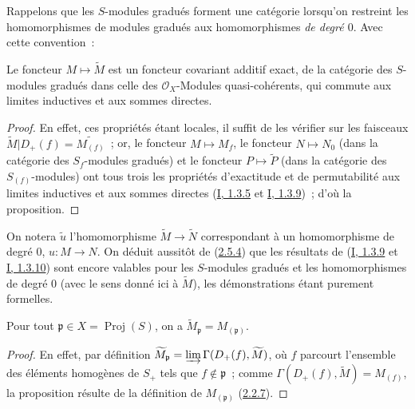 Rappelons que les $S$-modules gradués forment une catégorie lorsqu'on
restreint les homomorphismes de modules gradués aux homomorphismes
\emph{de degré $0$}. Avec cette convention~:

\begin{proposition}[2.5.4]
\label{II.2.5.4-fr}
Le foncteur $M\mapsto\widetilde{M}$ est un foncteur covariant additif exact,
de la catégorie des $S$-modules gradués dans celle des
$\mathcal{O}_X$-Modules quasi-cohérents, qui commute aux limites
inductives et aux sommes directes.
\end{proposition}

\begin{proof}
En effet, ces propriétés étant locales, il suffit de les vérifier sur les
faisceaux
$\widetilde{M}|D_+(f)=\widetilde{M_{(f)}}$~; or, le foncteur
$M\mapsto M_f$, le foncteur $N\mapsto N_0$ (dans la catégorie des
$S_f$-modules gradués) et le foncteur $P\mapsto\widetilde{P}$ (dans la
catégorie des $S_{(f)}$-modules) ont tous trois les propriétés d'exactitude
et de permutabilité aux limites inductives et aux sommes directes
(\hyperref[I.1.3.5-fr]{I, 1.3.5} et
\hyperref[I.1.3.9-fr]{I, 1.3.9})~; d'où la proposition.
\end{proof}

On notera $\widetilde{u}$ l'homomorphisme
$\widetilde{M}\to\widetilde{N}$ correspondant à un homomorphisme de degré
$0$, $u:M\to N$. On déduit aussitôt de
(\hyperref[II.2.5.4-fr]{2.5.4}) que les résultats de
(\hyperref[I.1.3.9-fr]{I, 1.3.9} et
\hyperref[I.1.3.10-fr]{I, 1.3.10}) sont encore valables pour les
$S$-modules gradués et les homomorphismes de degré $0$ (avec le sens donné
ici à $\widetilde{M}$), les démonstrations étant purement formelles.

\begin{proposition}[2.5.5]
\label{II.2.5.5-fr}
Pour tout $\mathfrak{p}\in X=\operatorname{Proj}(S)$, on a
$\widetilde{M}_{\mathfrak{p}}=M_{(\mathfrak{p})}$.
\end{proposition}

\begin{proof}
En effet, par définition
$\widetilde{M}_{\mathfrak{p}}=
\varinjlim\Gamma(D_+(f),\widetilde{M})$, où $f$ parcourt l'ensemble des
éléments homogènes de $S_+$ tels que $f\notin\mathfrak{p}$~; comme
$\Gamma(D_+(f),\widetilde{M})=M_{(f)}$, la proposition résulte de la
définition de $M_{(\mathfrak{p})}$
(\hyperref[II.2.2.7-fr]{2.2.7}).
\end{proof}
